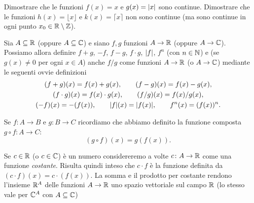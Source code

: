  \begin{exercise}
  Dimostrare che le funzioni $f(x) = x$ e $g(x)={\left|x\right|}$ sono continue.
  Dimostrare che le funzioni $h(x) = \lfloor x\rfloor$ e $k(x)=\lceil x \rceil$
  non sono continue (ma sono continue in ogni punto
  $x_0\in {\mathbb R} \setminus {\mathbb Z}$).
  \end{exercise}
  
  \begin{definition}
  Sia $A \subseteq {\mathbb R}$ (oppure $A\subseteq {\mathbb C}$) 
  e siano $f,g$ funzioni $A \to {\mathbb R}$ (oppure $A\to {\mathbb C}$).
  Possiamo allora definire
  $f+g$, $-f$, $f-g$, $f\cdot g$, ${\left|f\right|}$, $f^n$ (con $n\in {\mathbb N}$)
  e (se $g(x)\neq 0$ per ogni $x\in A$) anche $f/g$
  come funzioni $A \to {\mathbb R}$ (o $A\to {\mathbb C}$) mediante le seguenti ovvie
  definizioni
  \begin{gather*}
  (f+g)(x) = f(x) + g(x), \qquad
  (f-g)(x) = f(x) - g(x), \\
  (f\cdot g)(x) = f(x) \cdot g(x), \qquad
  (f/g)(x) = f(x) / g(x), \\
  (-f)(x) = -(f(x)), \qquad
  {\left|f\right|}(x) = {\left|f(x)\right|}, \qquad
  f^n(x) = (f(x))^n.
  \end{gather*}
  
  Se $f\colon A \to B$ e $g\colon B\to C$ ricordiamo
  che abbiamo definito la funzione composta
  $g\circ f\colon A \to C$:
  \[
    (g\circ f)(x) = g(f(x)).
  \]
  
  Se $c\in {\mathbb R}$ (o $c\in {\mathbb C}$) è un numero considereremo a volte 
  $c\colon A \to {\mathbb R}$ come una funzione \emph{costante}.
  Risulta quindi inteso che $c\cdot f$ è la funzione definita da
  $(c\cdot f)(x) = c\cdot (f(x))$.
  La somma e il prodotto per costante rendono l'insieme ${\mathbb R}^A$
  delle funzioni $A \to {\mathbb R}$ uno spazio vettoriale sul campo ${\mathbb R}$
  (lo stesso vale per ${\mathbb C}^A$ con $A\subseteq {\mathbb C}$)
  \end{definition}
  
